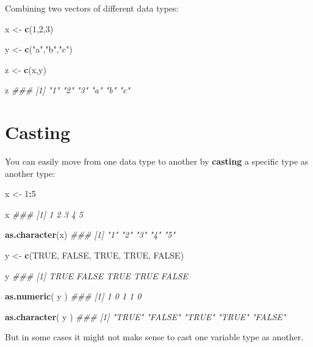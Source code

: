\documentclass[]{book}
\newenvironment{Shaded}{\begin{snugshade}}{\end{snugshade}}
\newcommand{\CommentTok}[1]{\textcolor[rgb]{0.56,0.35,0.01}{\textit{#1}}}
\newcommand{\DecValTok}[1]{\textcolor[rgb]{0.00,0.00,0.81}{#1}}
\newcommand{\KeywordTok}[1]{\textcolor[rgb]{0.13,0.29,0.53}{\textbf{#1}}}
\newcommand{\NormalTok}[1]{#1}
\newcommand{\OperatorTok}[1]{\textcolor[rgb]{0.81,0.36,0.00}{\textbf{#1}}}
\newcommand{\OtherTok}[1]{\textcolor[rgb]{0.56,0.35,0.01}{#1}}
\newcommand{\StringTok}[1]{\textcolor[rgb]{0.31,0.60,0.02}{#1}}
\theoremstyle{definition}
\theoremstyle{definition}
\theoremstyle{definition}
\theoremstyle{remark}
\begin{document}
Combining two vectors of different data types:

\begin{Shaded}
\begin{Highlighting}[]
\NormalTok{x <-}\StringTok{ }\KeywordTok{c}\NormalTok{(}\DecValTok{1}\NormalTok{,}\DecValTok{2}\NormalTok{,}\DecValTok{3}\NormalTok{)}

\NormalTok{y <-}\StringTok{ }\KeywordTok{c}\NormalTok{(}\StringTok{"a"}\NormalTok{,}\StringTok{"b"}\NormalTok{,}\StringTok{"c"}\NormalTok{)}

\NormalTok{z <-}\StringTok{ }\KeywordTok{c}\NormalTok{(x,y)}

\NormalTok{z}
\CommentTok{### [1] "1" "2" "3" "a" "b" "c"}
\end{Highlighting}
\end{Shaded}

\hypertarget{casting}{%
\section{Casting}\label{casting}}

You can easily move from one data type to another by \textbf{casting} a
specific type as another type:

\begin{Shaded}
\begin{Highlighting}[]

\NormalTok{x <-}\StringTok{ }\DecValTok{1}\OperatorTok{:}\DecValTok{5}

\NormalTok{x}
\CommentTok{### [1] 1 2 3 4 5}

\KeywordTok{as.character}\NormalTok{(x)}
\CommentTok{### [1] "1" "2" "3" "4" "5"}

\NormalTok{y <-}\StringTok{ }\KeywordTok{c}\NormalTok{(}\OtherTok{TRUE}\NormalTok{, }\OtherTok{FALSE}\NormalTok{, }\OtherTok{TRUE}\NormalTok{, }\OtherTok{TRUE}\NormalTok{, }\OtherTok{FALSE}\NormalTok{)}

\NormalTok{y}
\CommentTok{### [1]  TRUE FALSE  TRUE  TRUE FALSE}

\KeywordTok{as.numeric}\NormalTok{( y )}
\CommentTok{### [1] 1 0 1 1 0}

\KeywordTok{as.character}\NormalTok{( y )}
\CommentTok{### [1] "TRUE"  "FALSE" "TRUE"  "TRUE"  "FALSE"}
\end{Highlighting}
\end{Shaded}

But in some cases it might not make sense to cast one variable type as
another.
\end{document}
